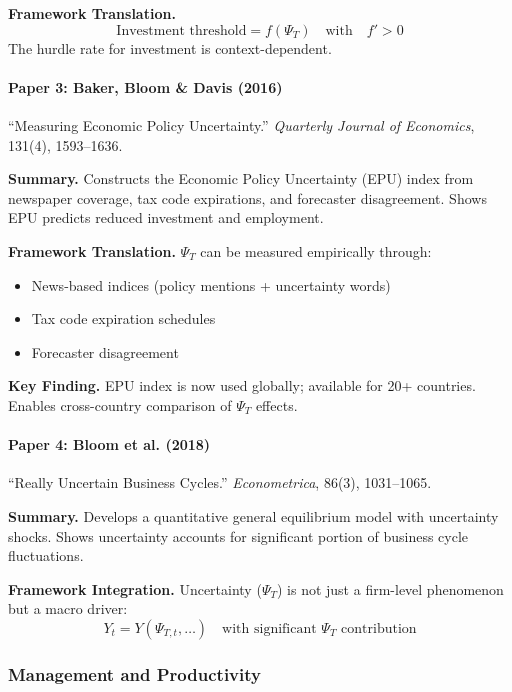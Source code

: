 \textbf{Framework Translation.}
\begin{equation}
  \text{Investment threshold} = f(\Psi_T) \quad \text{with} \quad f' > 0
\end{equation}
The hurdle rate for investment is context-dependent.

\paragraph{Paper 3: Baker, Bloom \& Davis (2016)}

``Measuring Economic Policy Uncertainty.''
\textit{Quarterly Journal of Economics}, 131(4), 1593--1636.

\textbf{Summary.}
Constructs the Economic Policy Uncertainty (EPU) index from newspaper coverage,
tax code expirations, and forecaster disagreement. Shows EPU predicts reduced
investment and employment.

\textbf{Framework Translation.}
$\Psi_T$ can be measured empirically through:
\begin{itemize}
  \item News-based indices (policy mentions + uncertainty words)
  \item Tax code expiration schedules
  \item Forecaster disagreement
\end{itemize}

\textbf{Key Finding.}
EPU index is now used globally; available for 20+ countries. Enables cross-country
comparison of $\Psi_T$ effects.

\paragraph{Paper 4: Bloom et al. (2018)}

``Really Uncertain Business Cycles.''
\textit{Econometrica}, 86(3), 1031--1065.

\textbf{Summary.}
Develops a quantitative general equilibrium model with uncertainty shocks.
Shows uncertainty accounts for significant portion of business cycle fluctuations.

\textbf{Framework Integration.}
Uncertainty ($\Psi_T$) is not just a firm-level phenomenon but a macro driver:
\begin{equation}
  Y_t = Y(\Psi_{T,t}, \ldots) \quad \text{with significant } \Psi_T \text{ contribution}
\end{equation}

\subsubsection{Management and Productivity}

